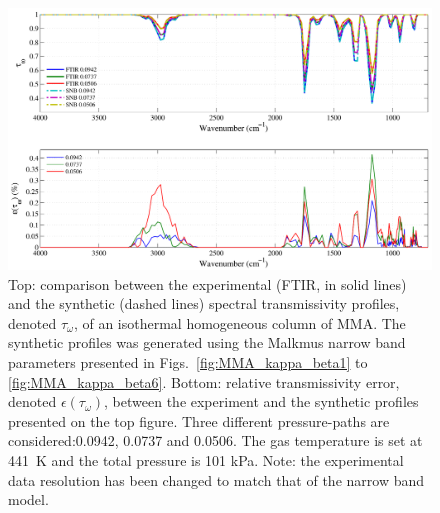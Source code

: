 \begin{figure}[p]
\includegraphics[width=\textwidth]{Figures/Comparison_Fit_MMA_MALKMUS_Temp441K.pdf}
\caption{Top: comparison between the experimental (FTIR, in solid lines) and the synthetic (dashed lines) spectral transmissivity profiles, denoted $\tau_{\omega}$, of an isothermal homogeneous column of MMA. The synthetic profiles was generated using the Malkmus narrow band parameters presented in Figs.~\ref{fig:MMA_kappa_beta1} to \ref{fig:MMA_kappa_beta6}. Bottom: relative transmissivity error, denoted $\epsilon{(\tau_{\omega})}$, between the experiment and the synthetic profiles presented on the top figure. Three different pressure-paths are considered:0.0942, 0.0737 and 0.0506. The gas temperature is set at 441~K and the total pressure is 101 kPa. Note: the experimental data resolution has been changed to match that of the narrow band model. \label{fig:MMA_SNBVerify_441K}}
\end{figure}

